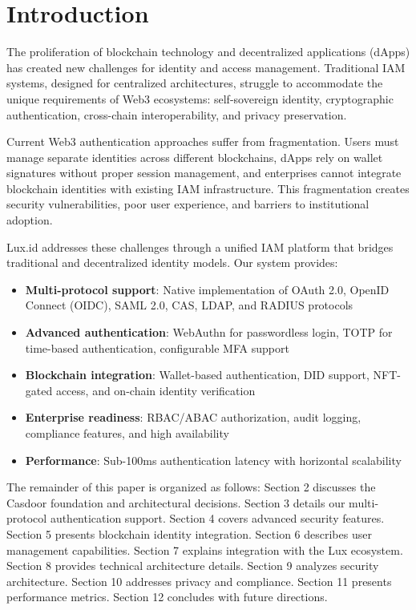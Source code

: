 \section{Introduction}


The proliferation of blockchain technology and decentralized applications (dApps) has created new challenges for identity and access management. Traditional IAM systems, designed for centralized architectures, struggle to accommodate the unique requirements of Web3 ecosystems: self-sovereign identity, cryptographic authentication, cross-chain interoperability, and privacy preservation.

Current Web3 authentication approaches suffer from fragmentation. Users must manage separate identities across different blockchains, dApps rely on wallet signatures without proper session management, and enterprises cannot integrate blockchain identities with existing IAM infrastructure. This fragmentation creates security vulnerabilities, poor user experience, and barriers to institutional adoption.

Lux.id addresses these challenges through a unified IAM platform that bridges traditional and decentralized identity models. Our system provides:

\begin{itemize}
    \item \textbf{Multi-protocol support}: Native implementation of OAuth 2.0, OpenID Connect (OIDC), SAML 2.0, CAS, LDAP, and RADIUS protocols
    \item \textbf{Advanced authentication}: WebAuthn for passwordless login, TOTP for time-based authentication, configurable MFA support
    \item \textbf{Blockchain integration}: Wallet-based authentication, DID support, NFT-gated access, and on-chain identity verification
    \item \textbf{Enterprise readiness}: RBAC/ABAC authorization, audit logging, compliance features, and high availability
    \item \textbf{Performance}: Sub-100ms authentication latency with horizontal scalability
\end{itemize}

The remainder of this paper is organized as follows: Section 2 discusses the Casdoor foundation and architectural decisions. Section 3 details our multi-protocol authentication support. Section 4 covers advanced security features. Section 5 presents blockchain identity integration. Section 6 describes user management capabilities. Section 7 explains integration with the Lux ecosystem. Section 8 provides technical architecture details. Section 9 analyzes security architecture. Section 10 addresses privacy and compliance. Section 11 presents performance metrics. Section 12 concludes with future directions.

